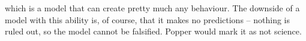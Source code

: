 which is a model that can create pretty much any behaviour. The downside of a model with this ability is, of course, 
that it makes no predictions -- nothing is ruled out, so the model cannot be falsified. Popper would mark it as 
not science.
%
